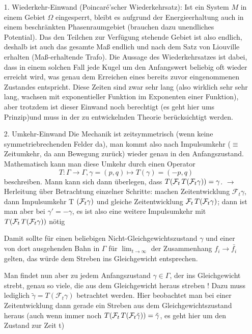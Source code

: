 \begin{itemize}
\item[1.] Wiederkehr-Einwand (Poincaré'scher Wiederkehrsatz):
Ist ein System $M$ in einem Gebiet $\Omega$ eingesperrt, bleibt es aufgrund der Energieerhaltung auch in einem beschränkten Phasenraumgebiet (brauchen dazu unendliches Potential). Das den Teilchen zur Verfügung stehende Gebiet ist also endlich, deshalb ist auch das gesamte Maß endlich und nach dem Satz von Liouville erhalten (Maß-erhaltende Trafo). Die Aussage des Wiederkehrsatzes ist dabei, dass in einem solchen Fall jede Kugel um den Anfangswert beliebig oft wieder erreicht wird, was genau dem Erreichen eines bereits zuvor eingenommenen Zustandes entspricht.
Diese Zeiten sind zwar sehr lang (also wirklich sehr sehr lang, wachsen mit exponentieller Funktion im Exponenten einer Funktion), aber trotzdem ist dieser Einwand noch berechtigt (es geht hier ums Prinzip)und muss in der zu entwickelnden Theorie berücksichtigt werden.

\item[2.] Umkehr-Einwand
Die Mechanik ist zeitsymmetrisch (wenn keine symmetriebrechenden Felder da), man kommt also nach Impulsumkehr ($\equiv$ Zeitumkehr, da ann Bewegung zurück) wieder genau in den Anfangszustand.\\
Mathematisch kann man diese Umkehr durch einen Operator
\begin{equation}\label{key}
T: \Gamma \rightarrow \Gamma, \gamma = (p,q) \mapsto T(\gamma) = (-p,q)
\end{equation}
beschreiben. Mann kann sich dann überlegen, dass $T \qty(\mathcal{F}_t \, T \qty(\mathcal{F}_t \gamma)) = \gamma$.
$\rightarrow$ Herleitung über Betrachtung einzelner Schritte: machen Zeitentwicklung $\mathcal{F}_t \gamma$, dann Impulsumkehr T $\qty(\mathcal{F}_t \gamma)$ und gleiche Zeitentwicklung $\mathcal{F}_t \, T \qty(\mathcal{F}_t \gamma)$; dann ist man aber bei $\gamma' = - \gamma$, es ist also eine weitere Impulsumkehr mit $T \qty(\mathcal{F}_t \, T \qty(\mathcal{F}_t \gamma))$ nötig


Damit sollte für einen beliebigen Nicht-Gleichgewichtszustand $\gamma$ und einer von dort ausgehenden Bahn in $\Gamma$ für $\lim_{t\rightarrow \infty}$ der Zusammenhang $f_i \rightarrow \bar{f_i}$ gelten, das würde dem Streben ins Gleichgewicht entsprechen.

Man findet nun aber zu jedem Anfangszustand $\gamma \in \Gamma$, der ins Gleichgewicht strebt, genau so viele, die aus dem Gleichgewicht heraus streben ! Dazu muss lediglich $\tilde{\gamma} = T(\mathcal{F}_t \gamma)$ betrachtet werden. Hier beobachtet man bei einer Zeitentwicklung dann gerade ein Streben aus dem Gleichgewichtszustand heraus (auch wenn immer noch $T \qty(\mathcal{F}_t \, T \qty(\mathcal{F}_t \tilde{\gamma})) = \tilde{\gamma}$, es geht hier um den Zustand zur Zeit t)
\end{itemize}

